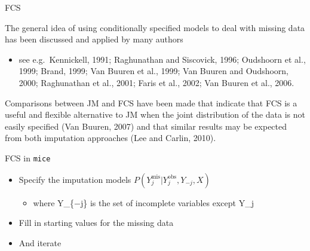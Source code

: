 \documentclass[ignorenonframetext,]{beamer}
\providecommand{\tightlist}{%
  \setlength{\itemsep}{0pt}\setlength{\parskip}{0pt}}
\begin{document}
\begin{frame}[fragile]{FCS}
\protect\hypertarget{fcs-1}{}

The general idea of using conditionally specified models to deal with
missing data has been discussed and applied by many authors

\begin{itemize}
\tightlist
\item
  see e.g.~Kennickell, 1991; Raghunathan and Siscovick, 1996; Oudshoorn
  et al., 1999; Brand, 1999; Van Buuren et al., 1999; Van Buuren and
  Oudshoorn, 2000; Raghunathan et al., 2001; Faris et al., 2002; Van
  Buuren et al., 2006.
\end{itemize}

Comparisons between JM and FCS have been made that indicate that FCS is
a useful and flexible alternative to JM when the joint distribution of
the data is not easily specified (Van Buuren, 2007) and that similar
results may be expected from both imputation approaches (Lee and Carlin,
2010).

\begin{block}{FCS in \texttt{mice}}

\begin{itemize}
\item
  Specify the imputation models
  \(P(Y_j^\mathrm{mis} | Y_j^\mathrm{obs}, Y_{-j}, X)\)

  \begin{itemize}
  \tightlist
  \item
    where Y\_\{−j\} is the set of incomplete variables except Y\_j
  \end{itemize}
\item
  Fill in starting values for the missing data
\item
  And iterate
\end{itemize}

\end{block}

\end{frame}
\end{document}
